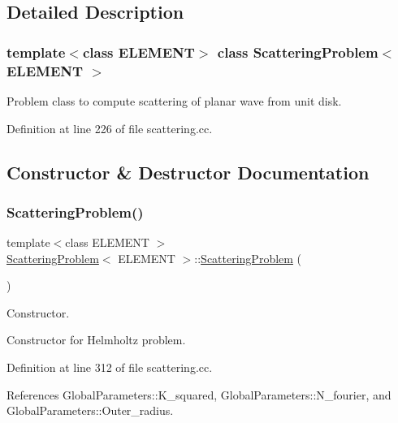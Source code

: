 \subsection{Detailed Description}
\subsubsection*{template$<$class E\+L\+E\+M\+E\+NT$>$\newline
class Scattering\+Problem$<$ E\+L\+E\+M\+E\+N\+T $>$}

Problem class to compute scattering of planar wave from unit disk. 

Definition at line 226 of file scattering.\+cc.



\subsection{Constructor \& Destructor Documentation}
\mbox{\label{classScatteringProblem_a94710f5d2ee52abc3df9dc8d1fd3eb71}} 
\subsubsection{\texorpdfstring{Scattering\+Problem()}{ScatteringProblem()}\hspace{0.1cm}{\footnotesize\ttfamily [1/2]}}
{\footnotesize\ttfamily template$<$class E\+L\+E\+M\+E\+NT $>$ \\
\hyperlink{classScatteringProblem}{Scattering\+Problem}$<$ E\+L\+E\+M\+E\+NT $>$\+::\hyperlink{classScatteringProblem}{Scattering\+Problem} (\begin{DoxyParamCaption}{ }\end{DoxyParamCaption})}



Constructor. 

Constructor for Helmholtz problem. 

Definition at line 312 of file scattering.\+cc.



References Global\+Parameters\+::\+K\+\_\+squared, Global\+Parameters\+::\+N\+\_\+fourier, and Global\+Parameters\+::\+Outer\+\_\+radius.

\mbox{\label{classScatteringProblem_a0a9838027d0286f22706fe6945bbac0a}} 
